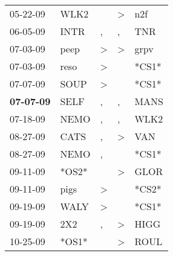 \begin{supertabular}{p{0.07\textwidth}p{0.06\textwidth}p{0.02\textwidth}p{0.02\textwidth}p{0.06\textwidth}}
          05-22-09\textsuperscript{} &           WLK2\textsuperscript{} &                  &     \textgreater &            n2f\textsuperscript{} \\
          06-05-09\textsuperscript{} &           INTR\textsuperscript{} &                , &                , &            TNR\textsuperscript{} \\
          07-03-09\textsuperscript{} &           peep\textsuperscript{} &     \textgreater &     \textgreater &           grpv\textsuperscript{} \\
          07-03-09\textsuperscript{} &           reso\textsuperscript{} &     \textgreater &                  &                            *CS1* \\
          07-07-09\textsuperscript{} &           SOUP\textsuperscript{} &     \textgreater &                  &                            *CS1* \\
 \textbf{07-07-09\textsuperscript{}} &           SELF\textsuperscript{} &                , &                , &           MANS\textsuperscript{} \\
          07-18-09\textsuperscript{} &           NEMO\textsuperscript{} &                , &                , &           WLK2\textsuperscript{} \\
          08-27-09\textsuperscript{} &           CATS\textsuperscript{} &                , &     \textgreater &            VAN\textsuperscript{} \\
          08-27-09\textsuperscript{} &           NEMO\textsuperscript{} &                , &                  &                            *CS1* \\
          09-11-09\textsuperscript{} &                            *OS2* &                  &     \textgreater &           GLOR\textsuperscript{} \\
          09-11-09\textsuperscript{} &           pigs\textsuperscript{} &     \textgreater &                  &                            *CS2* \\
          09-19-09\textsuperscript{} &           WALY\textsuperscript{} &     \textgreater &                  &                            *CS1* \\
          09-19-09\textsuperscript{} &            2X2\textsuperscript{} &                , &     \textgreater &           HIGG\textsuperscript{} \\
          10-25-09\textsuperscript{} &                            *OS1* &                  &     \textgreater &           ROUL\textsuperscript{} \\

\end{supertabular}
